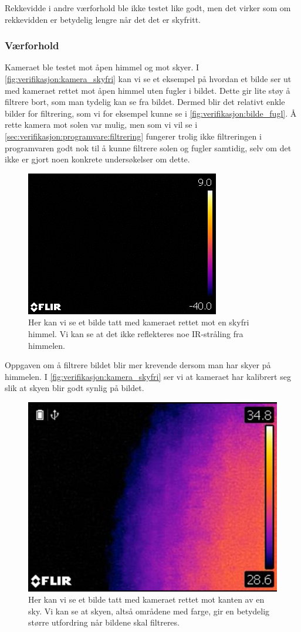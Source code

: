 Rekkevidde i andre værforhold ble ikke testet like godt, men det virker som om rekkevidden er betydelig lengre når det det er skyfritt.

\subsubsection{Værforhold}\label{sec:verifikasjon:kamera:værforhold}

Kameraet ble testet mot åpen himmel og mot skyer. 
I \autoref{fig:verifikasjon:kamera_skyfri} kan vi se et eksempel på hvordan et bilde ser ut med kameraet rettet mot åpen himmel uten fugler i bildet. 
Dette gir lite støy å filtrere bort, som man tydelig kan se fra bildet. 
Dermed blir det relativt enkle bilder for filtrering, som vi for eksempel kunne se i \autoref{fig:verifikasjon:bilde_fugl}. 
Å rette kamera mot solen var mulig, men som vi vil se i \autoref{sec:verifikasjon:programvare:filtrering} fungerer trolig ikke filtreringen i programvaren godt nok til å kunne filtrere solen og fugler samtidig, selv om det ikke er gjort noen konkrete undersøkelser om dette.

\begin{figure}[H]
    \centering
    \includegraphics[width=.5\textwidth]{verifikasjon-test/Kamera/skyfri.jpg}
    \caption{Her kan vi se et bilde tatt med kameraet rettet mot en skyfri himmel. Vi kan se at det ikke reflekteres noe IR-stråling fra himmelen.}
    \label{fig:verifikasjon:kamera_skyfri}
\end{figure}

Oppgaven om å filtrere bildet blir mer krevende dersom man har skyer på himmelen. 
I \autoref{fig:verifikasjon:kamera_skyfri} ser vi at kameraet har kalibrert seg slik at skyen blir godt synlig på bildet. 

\begin{figure}[H]
    \centering
    \includegraphics[width=.5\textwidth]{verifikasjon-test/Kamera/skyer3.JPG}
    \caption{Her kan vi se et bilde tatt med kameraet rettet mot kanten av en sky. Vi kan se at skyen, altså områdene med farge, gir en betydelig større utfordring når bildene skal filtreres.}
    \label{fig:verifikasjon:kamera_skyer}
\end{figure}


